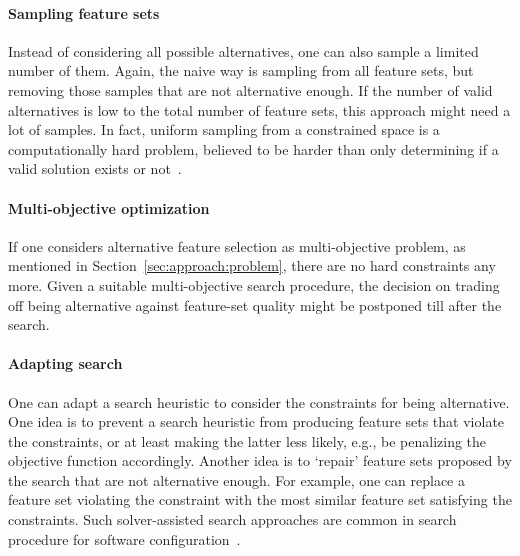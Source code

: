 \documentclass{article}
\theoremstyle{definition}
\begin{document}
\paragraph{Sampling feature sets}

Instead of considering all possible alternatives, one can also sample a limited number of them.
Again, the naive way is sampling from all feature sets, but removing those samples that are not alternative enough.
If the number of valid alternatives is low to the total number of feature sets, this approach might need a lot of samples.
In fact, uniform sampling from a constrained space is a computationally hard problem, believed to be harder than only determining if a valid solution exists or not~\cite{ermon2012uniform}.

\paragraph{Multi-objective optimization}

If one considers alternative feature selection as multi-objective problem, as mentioned in Section~\ref{sec:approach:problem}, there are no hard constraints any more.
Given a suitable multi-objective search procedure, the decision on trading off being alternative against feature-set quality might be postponed till after the search.

\paragraph{Adapting search}

One can adapt a search heuristic to consider the constraints for being alternative.
One idea is to prevent a search heuristic from producing feature sets that violate the constraints, or at least making the latter less likely, e.g., be penalizing the objective function accordingly.
Another idea is to `repair' feature sets proposed by the search that are not alternative enough.
For example, one can replace a feature set violating the constraint with the most similar feature set satisfying the constraints.
Such solver-assisted search approaches are common in search procedure for software configuration~\cite{white2010automated,henard2015combining,guo2018preserve}.
\end{document}
